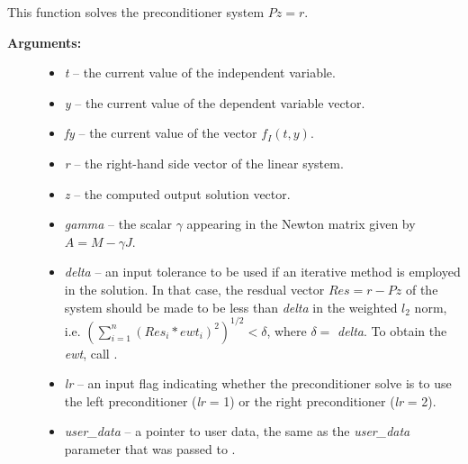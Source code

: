 \documentclass[letterpaper,10pt,english]{sphinxmanual}
\begin{document}
\begin{fulllineitems}
\label{c_interface/User_supplied:ARKSpilsPrecSolveFn}
This function solves the preconditioner system $Pz=r$.
\begin{description}
\item[{\textbf{Arguments:}}] \leavevmode\begin{itemize}
\item {} 
\emph{t} -- the current value of the independent variable.

\item {} 
\emph{y} -- the current value of the dependent variable vector.

\item {} 
\emph{fy} -- the current value of the vector $f_I(t,y)$.

\item {} 
\emph{r} -- the right-hand side vector of the linear system.

\item {} 
\emph{z} -- the computed output solution vector.

\item {} 
\emph{gamma} -- the scalar $\gamma$ appearing in the Newton
matrix given by $A=M-\gamma J$.

\item {} 
\emph{delta} -- an input tolerance to be used if an iterative method
is employed in the solution.  In that case, the resdual vector
$Res = r-Pz$ of the system should be made to be less than \emph{delta}
in the weighted $l_2$ norm, i.e. $\left(\sum_{i=1}^n
\left(Res_i * ewt_i\right)^2 \right)^{1/2} < \delta$, where $\delta =$
\emph{delta}.  To obtain the  \emph{ewt}, call
{\hyperref[c_interface/User_callable:ARKodeGetErrWeights]{}}.

\item {} 
\emph{lr} -- an input flag indicating whether the preconditioner
solve is to use the left preconditioner (\emph{lr} = 1) or the right
preconditioner (\emph{lr} = 2).

\item {} 
\emph{user\_data} -- a pointer to user data, the same as the
\emph{user\_data} parameter that was passed to {\hyperref[c_interface/User_callable:ARKodeSetUserData]{}}.


\end{itemize}
\end{description}
\end{fulllineitems}
\end{document}
